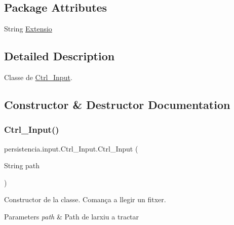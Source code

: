 \subsection*{Package Attributes}
\begin{DoxyCompactItemize}
\item 
String \hyperlink{classpersistencia_1_1input_1_1Ctrl__Input_a6041b56aa31f01f75d02382f98e259e5}{Extensio}
\end{DoxyCompactItemize}


\subsection{Detailed Description}
Classe de \hyperlink{classpersistencia_1_1input_1_1Ctrl__Input}{Ctrl\+\_\+\+Input}. 

\subsection{Constructor \& Destructor Documentation}
\mbox{\label{classpersistencia_1_1input_1_1Ctrl__Input_a00f3fa14d0329d6e4b9ddbe39ada1258}} 
\subsubsection{\texorpdfstring{Ctrl\+\_\+\+Input()}{Ctrl\_Input()}\hspace{0.1cm}{\footnotesize\ttfamily [1/2]}}
{\footnotesize\ttfamily persistencia.\+input.\+Ctrl\+\_\+\+Input.\+Ctrl\+\_\+\+Input (\begin{DoxyParamCaption}\item[{String}]{path }\end{DoxyParamCaption})\hspace{0.3cm}{\ttfamily [inline]}}



Constructor de la classe. Comança a llegir un fitxer. 


\begin{DoxyParams}{Parameters}
{\em path} & Path de l\textquotesingle{}arxiu a tractar \\
\hline
\end{DoxyParams}

